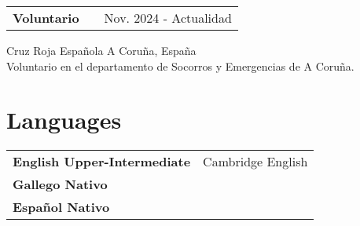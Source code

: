 \documentclass[a4paper,12pt]{article}
\makeatletter
\newenvironment{jobshort}[2]
    {
    \begin{tabularx}{\linewidth}{@{}l X r@{}}
    \textbf{#1} & \hfill &  #2 \\[3.75pt]
    \end{tabularx}
    }
    {
    }
\makeatother
\begin{document}
\begin{jobshort}{Voluntario}{Nov. 2024 - Actualidad}
Cruz Roja Española \hfill A Coruña, España \\[3.75pt]
Voluntario en el departamento de Socorros y Emergencias de A Coruña.
\end{jobshort}

\section{Languages}
\begin{tabularx}{\linewidth}{@{}l X@{}}
\textbf{English Upper-Intermediate} & \hfill Cambridge English \\
\textbf{Gallego Nativo} \\
\textbf{Español Nativo}
\end{tabularx}



\vfill
{}
\end{document}
